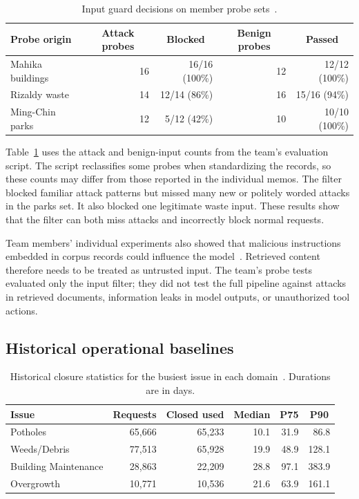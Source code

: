 \documentclass[11pt,letterpaper]{article}
\begin{document}
\begin{table}[htbp]
\centering
\caption{Input guard decisions on member probe sets~\cite{archive}.}
\label{tab:guard}
\begin{tabular}{@{}l r r r r@{}}
\toprule
Probe origin & \multicolumn{1}{c}{Attack probes} & \multicolumn{1}{c}{Blocked} & \multicolumn{1}{c}{Benign probes} & \multicolumn{1}{c}{Passed} \\
\midrule
Mahika buildings & 16 & 16/16 (100\%) & 12 & 12/12 (100\%) \\
Rizaldy waste    & 14 & 12/14 (86\%)  & 16 & 15/16 (94\%)  \\
Ming-Chin parks  & 12 & 5/12 (42\%)   & 10 & 10/10 (100\%) \\
\bottomrule
\end{tabular}
\end{table}

Table~\ref{tab:guard} uses the attack and benign-input counts from the team's evaluation script. The script reclassifies some probes when standardizing the records, so these counts may differ from those reported in the individual memos. The filter blocked familiar attack patterns but missed many new or politely worded attacks in the parks set. It also blocked one legitimate waste input. These results show that the filter can both miss attacks and incorrectly block normal requests.

Team members' individual experiments also showed that malicious instructions embedded in corpus records could influence the model~\cite{team}. Retrieved content therefore needs to be treated as untrusted input. The team's probe tests evaluated only the input filter; they did not test the full pipeline against attacks in retrieved documents, information leaks in model outputs, or unauthorized tool actions.

\subsection{Historical operational baselines}

\begin{table}[htbp]
\centering
\caption{Historical closure statistics for the busiest issue in each domain~\cite{archive}. Durations are in days.}
\label{tab:closure}
\begin{tabular}{@{}l r r r r r@{}}
\toprule
Issue & \multicolumn{1}{c}{Requests} & \multicolumn{1}{c}{Closed used} & \multicolumn{1}{c}{Median} & \multicolumn{1}{c}{P75} & \multicolumn{1}{c}{P90} \\
\midrule
Potholes             & 65,666 & 65,233 & 10.1 & 31.9 & 86.8  \\
Weeds/Debris         & 77,513 & 65,928 & 19.9 & 48.9 & 128.1 \\
Building Maintenance & 28,863 & 22,209 & 28.8 & 97.1 & 383.9 \\
Overgrowth           & 10,771 & 10,536 & 21.6 & 63.9 & 161.1 \\
\bottomrule
\end{tabular}
\end{table}
\end{document}
